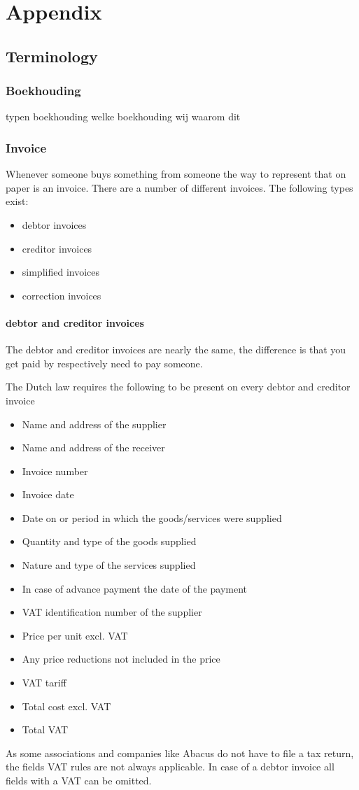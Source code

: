 \documentclass{report}
\newcommand{\mychapter}[2]{
    \setcounter{chapter}{#1}
    \setcounter{section}{0}
    \chapter*{#2}
    \addcontentsline{toc}{chapter}{#2}
}
\begin{document}
\mychapter{3}{Appendix}

\section{Terminology}
\subsection{Boekhouding}
typen boekhouding
welke boekhouding wij
waarom dit
\subsection{Invoice}
Whenever someone buys something from someone the way to represent that on paper is an invoice. There are a number of different invoices. The following types exist:
\begin{itemize}
\item debtor invoices
\item creditor invoices
\item simplified invoices
\item correction invoices
\end{itemize}

\subsubsection{debtor and creditor invoices}
The debtor and creditor invoices are nearly the same, the difference is that you get paid by respectively need to pay someone.

The Dutch law requires the following to be present on every debtor and creditor invoice
\begin{itemize}
	\item Name and address of the supplier
	\item Name and address of the receiver
	\item Invoice number
	\item Invoice date
	\item Date on or period in which the goods/services were supplied
	\item Quantity and type of the goods supplied
	\item Nature and type of the services supplied
	\item In case of advance payment the date of the payment
	\item VAT identification number of the supplier
	\item Price per unit excl. VAT
	\item Any price reductions not included in the price
	\item VAT tariff
	\item Total cost excl. VAT
	\item Total VAT
\end{itemize}
As some associations and companies like Abacus do not have to file a tax return, the fields VAT rules are not always applicable. In case of a debtor invoice all fields with a VAT can be omitted.
\end{document}
